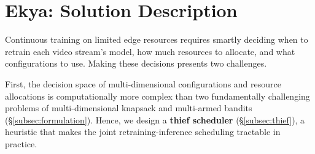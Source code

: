 


\section{{Ekya}: Solution Description}
\label{sec:solution}












Continuous training on limited edge resources requires smartly deciding when to retrain each video stream's model, how much resources to allocate, and what configurations to use. Making these decisions presents two challenges.

First, the decision space of multi-dimensional configurations and resource allocations is computationally more complex than two fundamentally challenging problems of multi-dimensional knapsack and multi-armed bandits (\S\ref{subsec:formulation}). %
Hence, we design a {\bf thief scheduler} (\S\ref{subsec:thief}), 
a heuristic that makes the joint retraining-inference scheduling tractable in practice. %

